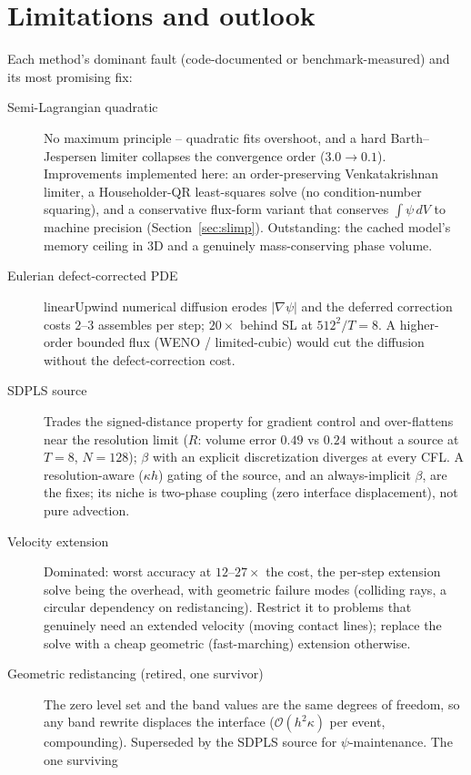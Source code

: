 \documentclass[preprint,3p,11pt]{elsarticle}
\begin{document}
\section{Limitations and outlook}
Each method's dominant fault (code-documented or benchmark-measured) and its
most promising fix:
\begin{description}
  \item[Semi-Lagrangian quadratic] No maximum principle -- quadratic fits
    overshoot, and a hard Barth--Jespersen limiter collapses the convergence
    order ($3.0\to0.1$). Improvements implemented here: an order-preserving
    Venkatakrishnan limiter, a Householder-QR least-squares solve (no
    condition-number squaring), and a conservative flux-form variant that
    conserves $\int\psi\,dV$ to machine precision (Section~\ref{sec:slimp}).
    Outstanding: the cached model's memory ceiling in 3D and a
    genuinely mass-conserving phase volume.
  \item[Eulerian defect-corrected PDE] linearUpwind numerical diffusion erodes
    $|\nabla\psi|$ and the deferred correction costs $2$--$3$ assembles per
    step; $20\times$ behind SL at $512^2/T{=}8$. A higher-order bounded flux
    (WENO / limited-cubic) would cut the diffusion without the defect-correction
    cost.
  \item[SDPLS source] Trades the signed-distance property for gradient control
    and over-flattens near the resolution limit ($R$: volume error $0.49$ vs
    $0.24$ without a source at $T{=}8$, $N{=}128$); $\beta$ with an explicit
    discretization diverges at every CFL. A resolution-aware ($\kappa h$)
    gating of the source, and an always-implicit $\beta$, are the fixes; its
    niche is two-phase coupling (zero interface displacement), not pure
    advection.
  \item[Velocity extension] Dominated: worst accuracy at $12$--$27\times$ the
    cost, the per-step extension solve being the overhead, with geometric
    failure modes (colliding rays, a circular dependency on redistancing).
    Restrict it to problems that genuinely need an extended velocity (moving
    contact lines); replace the solve with a cheap geometric (fast-marching)
    extension otherwise.
  \item[Geometric redistancing (retired, one survivor)] The zero level set
    and the band values are the same degrees of freedom, so any band rewrite
    displaces the interface ($\mathcal{O}(h^2\kappa)$ per event, compounding).
    Superseded by the SDPLS source for $\psi$-maintenance. The one surviving

\end{description}
\end{document}
